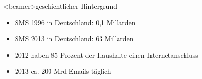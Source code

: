        \begin{frame}<beamer>{geschichtlicher Hintergrund}
          \begin{itemize}
        \item SMS 1996 in Deutschland: 0,1 Millarden
        \item SMS 2013 in Deutschland: 63 Millarden
        \item 2012 haben 85 Prozent der Haushalte einen Internetanschluss
        \item 2013 ca. 200 Mrd Emails täglich
   \end{itemize}
        \end{frame}
